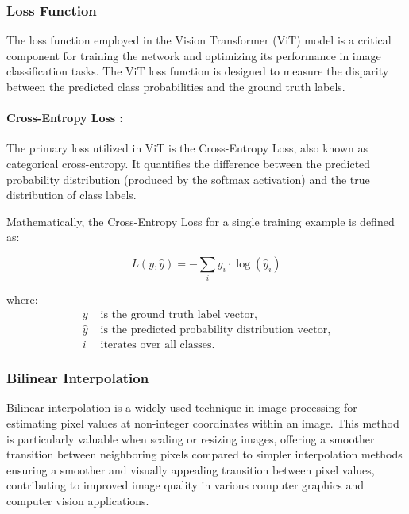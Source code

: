 \subsubsection{Loss Function}
The loss function employed in the Vision Transformer (ViT) model is a critical component for training the network and optimizing its performance in image classification tasks. The ViT loss function is designed to measure the disparity between the predicted class probabilities and the ground truth labels.

\paragraph{Cross-Entropy Loss :}
The primary loss utilized in ViT is the Cross-Entropy Loss, also known as categorical cross-entropy. It quantifies the difference between the predicted probability distribution (produced by the softmax activation) and the true distribution of class labels.

\noindent Mathematically, the Cross-Entropy Loss for a single training example is defined as:

\begin{equation}
    L(y, \hat{y}) = -\sum_i y_i \cdot \log(\hat{y}_i) \label{eq:loss_function}
\end{equation}

\noindent where:
\begin{align*}
    y       & \text{ is the ground truth label vector,}                 \\
    \hat{y} & \text{ is the predicted probability distribution vector,} \\
    i       & \text{ iterates over all classes.}
\end{align*}

\subsubsection{Bilinear Interpolation }
Bilinear interpolation is a widely used technique in image processing for estimating pixel values at non-integer coordinates within an image. This method is particularly valuable when scaling or resizing images, offering a smoother transition between neighboring pixels compared to simpler interpolation methods ensuring a smoother and visually appealing transition between pixel values, contributing to improved image quality in various computer graphics and computer vision applications.


